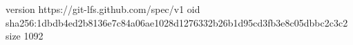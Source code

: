 version https://git-lfs.github.com/spec/v1
oid sha256:1dbdb4ed2b8136e7c84a06ae1028d1276332b26b1d95cd3fb3e8c05dbbc2c3c2
size 1092
